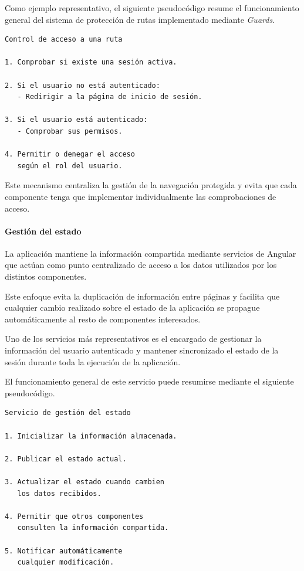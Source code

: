 Como ejemplo representativo, el siguiente pseudocódigo resume el funcionamiento general del sistema de protección de rutas implementado mediante \textit{Guards}.

\begin{Verbatim}[frame=single, fontsize=\small]
Control de acceso a una ruta

1. Comprobar si existe una sesión activa.

2. Si el usuario no está autenticado:
   - Redirigir a la página de inicio de sesión.

3. Si el usuario está autenticado:
   - Comprobar sus permisos.

4. Permitir o denegar el acceso
   según el rol del usuario.
\end{Verbatim}

Este mecanismo centraliza la gestión de la navegación protegida y evita que cada componente tenga que implementar individualmente las comprobaciones de acceso.

\paragraph{Gestión del estado}

La aplicación mantiene la información compartida mediante servicios de Angular que actúan como punto centralizado de acceso a los datos utilizados por los distintos componentes.

Este enfoque evita la duplicación de información entre páginas y facilita que cualquier cambio realizado sobre el estado de la aplicación se propague automáticamente al resto de componentes interesados.

Uno de los servicios más representativos es el encargado de gestionar la información del usuario autenticado y mantener sincronizado el estado de la sesión durante toda la ejecución de la aplicación.

El funcionamiento general de este servicio puede resumirse mediante el siguiente pseudocódigo.

\begin{Verbatim}[frame=single, fontsize=\small]
Servicio de gestión del estado

1. Inicializar la información almacenada.

2. Publicar el estado actual.

3. Actualizar el estado cuando cambien
   los datos recibidos.

4. Permitir que otros componentes
   consulten la información compartida.

5. Notificar automáticamente
   cualquier modificación.
\end{Verbatim}

